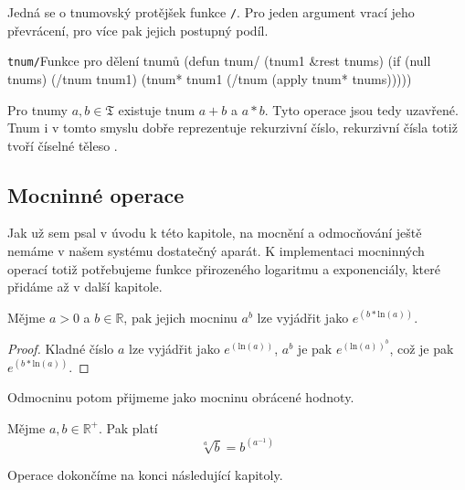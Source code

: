 Jedná se o tnumovský protějšek funkce \texttt{/}. Pro jeden argument vrací jeho převrácení, pro více pak jejich postupný podíl.

\begin{lispcode}{\texttt{tnum/}}{Funkce pro dělení tnumů}
(\textcolor{funkcionalni}{defun} \textcolor{pojmenovan}{tnum/} (tnum1 &rest tnums)
  (\textcolor{funkcionalni}{if} (\textcolor{funkcionalni}{null} tnums)
      (\textcolor{moje}{/tnum} tnum1)
    (\textcolor{moje}{tnum*} tnum1 (\textcolor{moje}{/tnum} (\textcolor{funkcionalni}{apply} \textquotesingle\textcolor{moje}{tnum*} tnums)))))
\end{lispcode}

Pro tnumy $a, b\in\mathfrak{T}$ existuje tnum $a+b$ a $a*b$. Tyto operace jsou tedy uzavřené. Tnum i v tomto smyslu dobře reprezentuje rekurzivní číslo, rekurzivní čísla totiž tvoří číselné těleso \cite{rice:kompr}.

\subsection{Mocninné operace}
Jak už sem psal v úvodu k této kapitole, na mocnění a odmocňování ještě nemáme v našem systému dostatečný aparát. K implementaci mocninných operací totiž potřebujeme funkce přirozeného logaritmu a exponenciály, které přidáme až v další kapitole.

\begin{lemma}\label{vet:mocnina_tnumu}
Mějme $a>0$ a $b\in\mathbb{R}$, pak jejich mocninu $a^b$ lze vyjádřit jako $e^{(b*\mathrm{ln}(a))}$.
\begin{proof}
Kladné číslo $a$ lze vyjádřit jako $e^{(\mathrm{ln}(a))}$, $a^b$ je pak $e^{({\mathrm{ln}(a)})^b}$, což je pak $e^{(b*\mathrm{ln}(a))}$.
\end{proof}
\end{lemma}

Odmocninu potom přijmeme jako mocninu obrácené hodnoty.

\begin{fact}\label{fac:odmocnina_tnumu}
Mějme $a, b\in\mathbb{R^+}$. Pak platí
\begin{equation}
\sqrt[a]{b}=b^{(a^{-1})}
\end{equation}
\end{fact}

Operace dokončíme na konci následující kapitoly.

